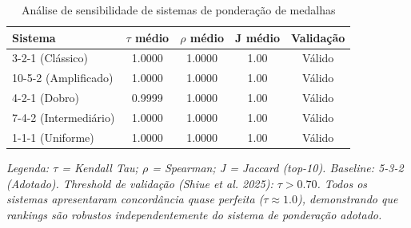 \begin{table}[h]
\centering
\caption{Análise de sensibilidade de sistemas de ponderação de medalhas}
\label{tab:weight_sensitivity}
\begin{tabular}{lcccc}
\hline
\textbf{Sistema} & \textbf{$\tau$ médio} & \textbf{$\rho$ médio} & \textbf{J médio} & \textbf{Validação} \\
\hline
3-2-1 (Clássico) & 1.0000 & 1.0000 & 1.00 & Válido \\
10-5-2 (Amplificado) & 1.0000 & 1.0000 & 1.00 & Válido \\
4-2-1 (Dobro) & 0.9999 & 1.0000 & 1.00 & Válido \\
7-4-2 (Intermediário) & 1.0000 & 1.0000 & 1.00 & Válido \\
1-1-1 (Uniforme) & 1.0000 & 1.0000 & 1.00 & Válido \\
\hline
\end{tabular}

\vspace{0.3cm}

\footnotesize
\textit{Legenda: $\tau$ = Kendall Tau; $\rho$ = Spearman; J = Jaccard (top-10). Baseline: 5-3-2 (Adotado). Threshold de validação (Shiue et al. 2025): $\tau > 0.70$. Todos os sistemas apresentaram concordância quase perfeita ($\tau \approx 1.0$), demonstrando que rankings são robustos independentemente do sistema de ponderação adotado.}
\end{table}
